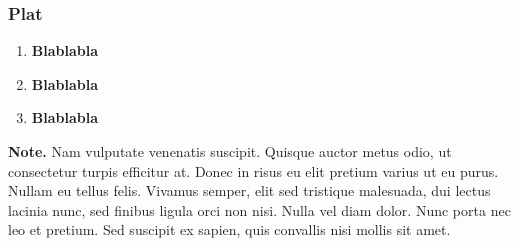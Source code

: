 \documentclass[aspectratio=169]{beamer}
\begin{document}
\begin{frame}[label=second-part]
\frametitle{Plat}

  \begin{enumerate}
    \item \textbf{Blablabla} \vspace{0.5em}
    \item \textbf{Blablabla} \vspace{0.5em}
    \item \textbf{Blablabla} \vspace{0.5em}
  \end{enumerate}
  
  \vfill
  \begin{alertblock}{}
  \normalsize
  \textbf{Note.} Nam vulputate venenatis suscipit. Quisque auctor metus odio, ut consectetur turpis efficitur at. Donec in risus eu elit pretium varius ut eu purus. Nullam eu tellus felis. Vivamus semper, elit sed tristique malesuada, dui lectus lacinia nunc, sed finibus ligula orci non nisi. Nulla vel diam dolor. Nunc porta nec leo et pretium. Sed suscipit ex sapien, quis convallis nisi mollis sit amet.
  \end{alertblock}
\end{frame}
\end{document}
